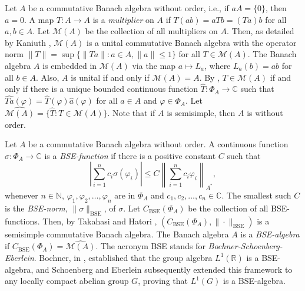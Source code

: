 \documentclass{amsart}
\theoremstyle{definition}
\theoremstyle{remark}
\numberwithin{equation}{section}
\begin{document}
Let $A$ be a commutative Banach algebra without order, i.e., if $aA=\{0\}$, then $a=0$. A map $T:A \to A$ is a \emph{multiplier} \cite{larsen1971} on $A$ if $T(ab)=aTb=(Ta)b$ for all $a, b \in A$. Let $\mathcal M(A)$ be the collection of all multipliers on $A$. Then, as detailed by Kaniuth \cite[Proposition 1.4.11]{kaniuth2009}, $\mathcal M(A)$ is a unital commutative Banach algebra with the operator norm $\|T\|=\sup\{\|Ta\|:a \in A, \|a\|\leq 1\}$ for all $T\in \mathcal M(A)$. The Banach algebra $A$ is embedded in $\mathcal M(A)$ via the map $a\mapsto L_a$, where $L_a(b)=ab$ for all $b \in A$. Also, $A$ is unital if and only if $\mathcal M(A)=A$. By \cite[Theorem 1.2.2]{larsen1971}, $T \in \mathcal M(A)$ if and only if there is a unique bounded continuous function $\widehat T:\Phi_A\to \mathbb C$ such that $\widehat{Ta}(\varphi)=\widehat T(\varphi)\widehat a(\varphi)$ for all $a \in A$ and $\varphi \in \Phi_A$. Let $\widehat{\mathcal M(A)}=\{\widehat T:T \in \mathcal M(A)\}$. Note that if $A$ is semisimple, then $A$ is without order.

Let $A$ be a commutative Banach algebra without order. A continuous function $\sigma:\Phi_A\to \mathbb C$ is a \emph{BSE-function} \cite{takahasi1990} if there is a positive constant $C$ such that
\begin{equation}\label{bse_ineq}
\left|\sum_{i=1}^n c_i\sigma(\varphi_i)\right|\leq C\left\|\sum_{i=1}^n c_i\varphi_i\right\|_{A^\ast},
\end{equation}
whenever $n \in \mathbb N$, $\varphi_1, \varphi_2,\ldots, \varphi_n$ are in $\Phi_A$ and $c_1,c_2,\ldots,c_n \in \mathbb C$. The smallest such $C$ is the \emph{BSE-norm}, $\|\sigma\|_{\operatorname{BSE}}$, of $\sigma$. Let $C_{\operatorname{BSE}}(\Phi_A)$ be the collection of all BSE-functions. Then, by Takahasi and Hatori \cite{takahasi1990}, $(C_{\operatorname{BSE}}(\Phi_A),\|\cdot\|_{\operatorname{BSE}})$ is a semisimple commutative Banach algebra. The Banach algebra $A$ is a \emph{BSE-algebra} if $C_{\operatorname{BSE}}(\Phi_A)=\widehat{\mathcal M(A)}$. The acronym BSE stands for \emph{Bochner-Schoenberg-Eberlein}. Bochner, in \cite{bochner}, established that the group algebra $L^1(\mathbb R)$ is a BSE-algebra, and Schoenberg \cite{schoenberg} and Eberlein \cite{eberlein} subsequently extended this framework to any locally compact abelian group $G$, proving that $L^1(G)$ is a BSE-algebra.
\end{document}
